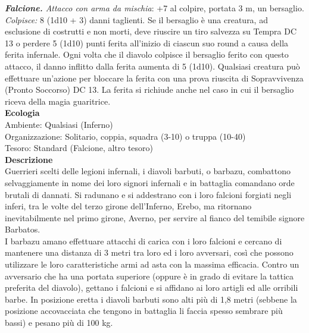 \begin{multicols}{2}
\emph{\textbf{Falcione.} Attacco con arma da mischia}: +7 al colpire, portata 3 m, un bersaglio.
\emph{Colpisce:} 8 (1d10 + 3) danni taglienti. Se il bersaglio è una creatura, ad esclusione di costrutti e non morti, deve riuscire un tiro salvezza su Tempra DC  13 o perdere 5 (1d10) punti ferita all'inizio di ciascun suo round a causa della ferita infernale. Ogni volta che il diavolo colpisce il bersaglio ferito con questo attacco, il  danno inflitto dalla ferita aumenta di 5 (1d10). Qualsiasi creatura può effettuare un'azione per bloccare la ferita con una prova riuscita di Sopravvivenza (Pronto Soccorso) DC  13. La ferita si richiude anche nel caso in cui il bersaglio riceva della magia guaritrice.\\
\textbf{Ecologia}\\
Ambiente: Qualsiasi (Inferno)\\
Organizzazione: Solitario, coppia, squadra (3-10) o truppa (10-40)\\
Tesoro: Standard (Falcione, altro tesoro)\\
\textbf{Descrizione}\\
Guerrieri scelti delle legioni infernali, i diavoli barbuti, o barbazu, combattono selvaggiamente in nome dei loro signori infernali e in battaglia comandano orde brutali di dannati. Si radunano e si addestrano con i loro falcioni forgiati negli inferi, tra le volte del terzo girone dell'Inferno, Erebo, ma ritornano inevitabilmente nel primo girone, Averno, per servire al fianco del temibile signore Barbatos.\\
I barbazu amano effettuare attacchi di carica con i loro falcioni e cercano di mantenere una distanza di 3 metri tra loro ed i loro avversari, così che possono utilizzare le loro caratteristiche armi ad asta con la massima efficacia. Contro un avversario che ha una portata superiore (oppure è in grado di evitare la tattica preferita del diavolo), gettano i falcioni e si affidano ai loro artigli ed alle orribili barbe. In posizione eretta i diavoli barbuti sono alti più di 1,8 metri (sebbene la posizione accovacciata che tengono in battaglia li faccia spesso sembrare più bassi) e pesano più di 100 kg.\\


\end{multicols}
